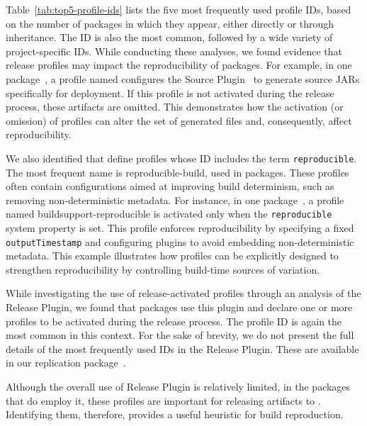 \documentclass[smallextended]{svjour3}
\newcommand{\tabref}[1]{Table~\ref{tab:#1}}
\newcommand{\maven}[1]{\tool{Maven{#1}}}
\newcommand{\central}{\tool{Maven Central}}
\begin{document}
{\begin{table}
\centering
\caption{Top 5 Profile IDs by Number of Packages}
\label{tab:top5-profile-ids}

\end{table}


\tabref{top5-profile-ids} lists the five most frequently used profile IDs, based on the number of packages in which they appear, either directly or through inheritance. The ID  is also the most common, followed by a wide variety of project-specific IDs.
While conducting these analyses, we found evidence that release profiles may impact the reproducibility of packages. For example, in one package~\cite{jsign-parent-4.2}, a profile named  configures the \maven{} Source Plugin~\cite{mavenSourcePlugin} to generate source JARs specifically for deployment. If this profile is not activated during the release process, these artifacts are omitted. This demonstrates how the activation (or omission) of profiles can alter the set of generated files and, consequently, affect reproducibility.


We also identified  that define profiles whose ID includes the term \texttt{reproducible}. The most frequent name is reproducible-build, used in  packages. These profiles often contain configurations aimed at improving build determinism, such as removing non-deterministic metadata. For instance, in one package~\cite{buildsupport-27}, a profile named buildsupport-reproducible is activated only when the \texttt{reproducible} system property is set. This profile enforces reproducibility by specifying a fixed \texttt{outputTimestamp} and configuring plugins to avoid embedding non-deterministic metadata. This example illustrates how profiles can be explicitly designed to strengthen reproducibility by controlling build-time sources of variation.

While investigating the use of release-activated profiles through an analysis of the \maven{} Release Plugin, we found that  packages use this plugin and declare one or more profiles to be activated during the release process. The profile ID  is again the most common in this context. For the sake of brevity, we do not present the full details of the most frequently used IDs in the \maven{} Release Plugin. These are available in our replication package~\cite{repPackage}.

Although the overall use of \maven{} Release Plugin is relatively limited, in the packages that do employ it, these profiles are important for releasing artifacts to \central{}. Identifying them, therefore, provides a useful heuristic for build reproduction.





}
\end{document}
